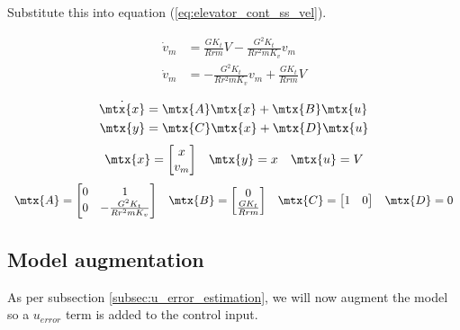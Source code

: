 Substitute this into equation (\ref{eq:elevator_cont_ss_vel}).

\begin{align}
  \dot{v}_m &= \frac{GK_t}{Rrm} V - \frac{G^2 K_t}{Rr^2 m K_v} v_m \nonumber \\
  \dot{v}_m &= -\frac{G^2 K_t}{Rr^2 m K_v} v_m + \frac{GK_t}{Rrm} V
\end{align}

\begin{theorem}
  \begin{align*}
    \dot{\mtx{x}} &= \mtx{A} \mtx{x} + \mtx{B} \mtx{u} \\
    \mtx{y} &= \mtx{C} \mtx{x} + \mtx{D} \mtx{u}
  \end{align*}
  \begin{equation*}
    \begin{array}{ccc}
      \mtx{x} =
      \begin{bmatrix}
        x \\
        v_m
      \end{bmatrix} &
      \mtx{y} = x &
      \mtx{u} = V
    \end{array}
  \end{equation*}
  \begin{equation}
    \begin{array}{cccc}
      \mtx{A} =
      \begin{bmatrix}
        0 & 1 \\
        0 & -\frac{G^2 K_t}{Rr^2 mK_v}
      \end{bmatrix} &
      \mtx{B} =
      \begin{bmatrix}
        0 \\
        \frac{GK_t}{Rrm}
      \end{bmatrix} &
      \mtx{C} =
      \begin{bmatrix}
        1 & 0
      \end{bmatrix} &
      \mtx{D} = 0
    \end{array}
  \end{equation}
\end{theorem}

\subsection{Model augmentation}

As per subsection \ref{subsec:u_error_estimation}, we will now augment the
\gls{model} so a $u_{error}$ term is added to the \gls{control input}.

